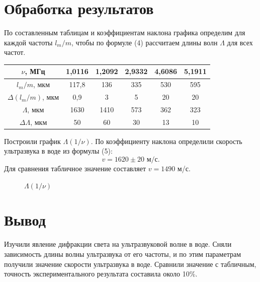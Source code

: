 \documentclass[a4paper,12pt]{article}
\begin{document}
	\section*{Обработка результатов}
	По составленным таблицам и коэффициентам наклона графика определим для каждой частоты $l_m/m$, чтобы по формуле (4) рассчитаем длины волн $\Lambda$ для всех частот.
	\begin{center}
	    \begin{tabular}{|c|c|c|c|c|c|}
	         \hline
	         $\nu$, МГц & 1,0116 & 1,2092 & 2,9332 & 4{,}6086 & 5{,}1911 \\ \hline
	         $l_m/m$, мкм & 117{,}8 & 136 & 335 & 530 & 595 \\ \hline
	         $\Delta(l_m/m)$, мкм &  0{,}9 & 3 & 5 & 20 & 20 \\ \hline
	         $\Lambda$, мкм & 1630 & 1410 & 573 & 362 & 323 \\ \hline
	         $\Delta\Lambda$, мкм & 50 & 60 & 30 & 13 & 10 \\ \hline
	    \end{tabular}
	\end{center}
	Построили график $\Lambda(1/\nu)$. По коэффициенту наклона определили скорость ультразвука в воде из формулы (5):
	$$v=1620\pm20\text{ м/с}.$$
	Для сравнения табличное значение составляет $v=1490$ м/с.
	\begin{figure}[!htb] \centering
		\caption{$\Lambda(1/\nu)$}
	\end{figure}
    \section*{Вывод}
	Изучили явление дифракции света на ультразвуковой волне в воде. Сняли зависимость длины волны ультразвука от его частоты, и по этим параметрам получили значение скорости ультразвука в воде. Сравнили значение с табличным, точность экспериментального результата составила около 10\%.
\end{document}
